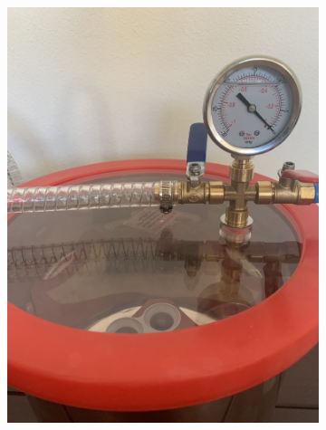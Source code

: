 \documentclass[twoside, 11pt]{article}
\begin{document}
\begin{figure}[H]
\begin{subfigure}[t]{0.165\linewidth}
		\includegraphics[width=\textwidth]{vacume}
	\end{subfigure}%
	\begin{subfigure}[t]{0.165\linewidth}
		\centering

\end{subfigure}
\end{figure}
\end{document}
